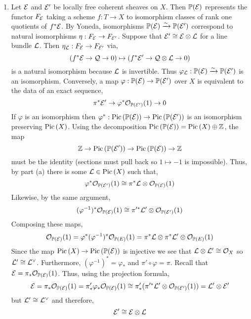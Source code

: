 \documentclass[12pt]{article}
\begin{document}
\begin{enumerate}
\begin{proof}
This follows immediately from above given that $\pi_* \struct{\P(\E)} = \struct{X}$ [II, Prop. 7.11].
\end{proof}

Alternatively, the isomorphism $\varphi_\alpha : \L|_{\pi^{-1}(U_\alpha)} \iso \pi^* \M_\alpha$ prove that,
\[ (\pi_* \L)|_{U_\alpha} = \pi_* (\L|_{\pi^{-1}(U_\alpha)}) \cong \pi_* \pi^* \M_\alpha = \M_\alpha \]
because $\pi_* \struct{\P} = \struct{X}$ using the projection formla. Therefore $\pi_* \L$ is a line bundle. Then the natural map $\pi^* \pi_* \L \to \L$ is an isomorphism because locally it is given by $\pi^* \pi_* \pi^* \M_\alpha \to \pi^* \M_\alpha$ which is an isomorphism because $\pi_* \pi^* \M_\alpha = \M_\alpha$ by the adjunction formula. 


\item Let $\mathcal{E}$ and $\mathcal{E}'$ be locally free coherent sheaves on $X$. Then $\mathbb{P}(\mathcal{E})$ represents the functor $F_{\mathcal{E}}$ taking a scheme $f : T \to X$ to isomorphism classes of rank one quotients of $f^* \mathcal{E}$. By Yoneda, isomorphisms $\mathbb{P}(\mathcal{E}) \xrightarrow{\sim} \mathbb{P}(\mathcal{E}')$ correspond to natural isomorphisms $\eta : F_{\mathcal{E}} \to F_{\mathcal{E}'}$. Suppose that $\mathcal{E}' \cong \mathcal{E} \otimes \mathcal{L}$ for a line bundle $\mathcal{L}$. Then $\eta_{\mathcal{L}} : F_{\mathcal{E}} \to F_{\mathcal{E}'}$ via,
\[ (f^* \mathcal{E} \to \mathcal{Q} \to 0) \mapsto (f^* \mathcal{E}' \to \mathcal{Q} \otimes \mathcal{L} \to 0) \] 
is a natural isomorphism because $\mathcal{L}$ is invertible. Thus $\varphi_{\mathcal{L}} : \mathbb{P}(\mathcal{E}) \xrightarrow{\sim} \mathbb{P}(\mathcal{E}')$ is an isomorphism. Conversely, a map $\varphi : \mathbb{P}(\mathcal{E}) \to \mathbb{P}(\mathcal{E}')$ over $X$ is equivalent to the data of an exact sequence,
\[ \pi^* \mathcal{E}' \to \varphi^*\mathcal{O}_{\mathbb{P}(\mathcal{E}')}(1) \to 0 \]
If $\varphi$ is an isomorphism then $\varphi^* : \mathrm{Pic} \left( \mathbb{P}(\mathcal{E}) \right) \to \mathrm{Pic} \left( \mathbb{P}(\mathcal{E}') \right)$ is an isomorphism preserving $\mathrm{Pic} \left( X \right)$. Using the decomposition $\mathrm{Pic} \left( \mathbb{P}(\mathcal{E}) \right) = \mathrm{Pic} \left( X \right) \oplus \mathbb{Z}$, the map 
\[ \mathbb{Z} \to \mathrm{Pic} \left( \mathbb{P}(\mathcal{E}') \right) \to \mathrm{Pic} \left( \mathbb{P}(\mathcal{E}) \right) \to \mathbb{Z} \]
must be the identity (sections must pull back so $1 \mapsto -1$ is impossible). Thus, by part (a) there is some $\mathcal{L} \in \mathrm{Pic} \left( X \right)$ such that,
\[ \varphi^* \mathcal{O}_{\mathbb{P}(\mathcal{E}')}(1) \cong \pi^* \mathcal{L} \otimes \mathcal{O}_{\mathbb{P}(\mathcal{E})}(1) \]
Likewise, by the same argument,
\[ (\varphi^{-1})^* \mathcal{O}_{\mathbb{P}(\mathcal{E})}(1) \cong \pi'^* \mathcal{L}' \otimes \mathcal{O}_{\mathbb{P}(\mathcal{E}')}(1) \]
Composing these maps,
\[ \mathcal{O}_{\mathbb{P}(\mathcal{E})}(1) = \varphi^* (\varphi^{-1})^* \mathcal{O}_{\mathbb{P}(E)}(1) = \pi^* \mathcal{L} \otimes \pi^* \mathcal{L}' \otimes \mathcal{O}_{\mathbb{P}(E)}(1) \]
Since the map $\mathrm{Pic} \left( X \right) \to \mathrm{Pic} \left( \mathbb{P}(\mathcal{E}) \right)$ is injective we see that $\mathcal{L} \otimes \mathcal{L}' \cong \mathcal{O}_{X}$ so $\mathcal{L}' \cong \mathcal{L}^\vee$. Furthermore, $(\varphi^{-1})^* = \varphi_*$ and $\pi' \circ \varphi = \pi$. Recall that $\mathcal{E} = \pi_* \mathcal{O}_{\mathbb{P}(\mathcal{E})}(1)$. Thus, using the projection formula,
\[ \mathcal{E} = \pi_* \mathcal{O}_{\mathbb{P}(\mathcal{E})}(1) = \pi'_* \varphi_* \mathcal{O}_{\mathbb{P}(\mathcal{E})}(1) \cong \pi'_* (\pi'^* \mathcal{L}' \otimes \mathcal{O}_{\mathbb{P}(\mathcal{E}')}(1)) = \mathcal{L}' \otimes \mathcal{E}' \]
but $\mathcal{L}' \cong \mathcal{L}^{\vee}$ and therefore,
\[ \mathcal{E}' \cong \mathcal{E} \otimes \mathcal{L} \]
\end{enumerate}
\end{document}
